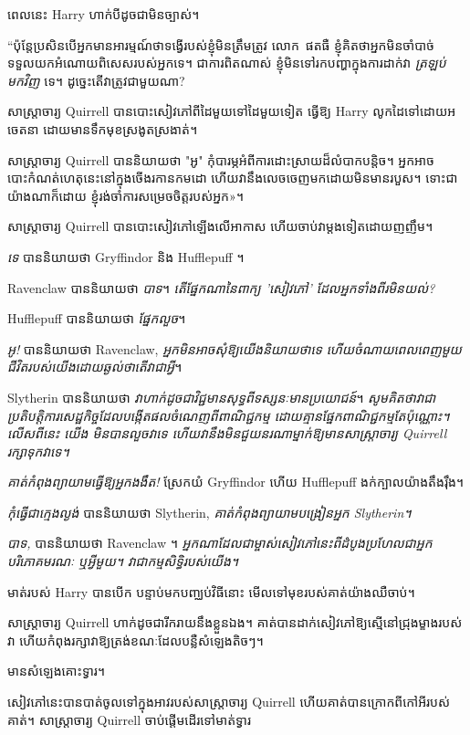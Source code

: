 {{{{ពេលនេះ Harry ហាក់បីដូចជាមិនច្បាស់។

“ប៉ុន្តែប្រសិនបើអ្នកមានអារម្មណ៍ថាទង្វើរបស់ខ្ញុំមិនត្រឹមត្រូវ លោក~ផតធឺ ខ្ញុំគិតថាអ្នកមិនចាំបាច់ទទួលយកអំណោយពិសេសរបស់អ្នកទេ។ ជាការពិតណាស់ ខ្ញុំមិនទៅរកបញ្ហាក្នុងការដាក់វា \emph{ត្រឡប់មកវិញ} ទេ។ ដូច្នេះ​តើ​វា​ត្រូវ​ជា​មួយ​ណា?

សាស្ត្រាចារ្យ Quirrell បានបោះសៀវភៅពីដៃមួយទៅដៃមួយទៀត ធ្វើឱ្យ Harry លូកដៃទៅដោយអចេតនា ដោយមានទឹកមុខស្រងូតស្រងាត់។

សាស្រ្តាចារ្យ Quirrell បាននិយាយថា "អូ" កុំបារម្ភអំពីការដោះស្រាយដ៏លំបាកបន្តិច។ អ្នកអាចបោះកំណត់ហេតុនេះនៅក្នុងចើងរកានកមដោ ហើយវានឹងលេចចេញមកដោយមិនមានរបួស។ ទោះ​ជា​យ៉ាង​ណា​ក៏​ដោយ ខ្ញុំ​រង់ចាំ​ការ​សម្រេច​ចិត្ត​របស់​អ្នក»។

សាស្ត្រាចារ្យ Quirrell បានបោះសៀវភៅឡើងលើអាកាស ហើយចាប់វាម្តងទៀតដោយញញឹម។

\emph{ទេ} បាននិយាយថា Gryffindor និង Hufflepuff ។

Ravenclaw បាននិយាយថា \emph{បាទ}។ \emph{តើផ្នែកណានៃពាក្យ 'សៀវភៅ' ដែលអ្នកទាំងពីរមិនយល់?}

Hufflepuff បាននិយាយថា \emph{ផ្នែកលួច}។

\emph{អូ!} បាននិយាយថា Ravenclaw, \emph{អ្នកមិនអាចសុំឱ្យយើងនិយាយថាទេ ហើយចំណាយពេលពេញមួយជីវិតរបស់យើងដោយឆ្ងល់ថាតើវាជាអ្វី}។

Slytherin បាននិយាយថា \emph{វាហាក់ដូចជាវិជ្ជមានសុទ្ធពីទស្សនៈមានប្រយោជន៍}។ \emph{សូមគិតថាវាជាប្រតិបត្តិការសេដ្ឋកិច្ចដែលបង្កើតផលចំណេញពីពាណិជ្ជកម្ម ដោយគ្មានផ្នែកពាណិជ្ជកម្មតែប៉ុណ្ណោះ។ លើសពីនេះ \emph{យើង} មិនបានលួចវាទេ ហើយវានឹងមិនជួយនរណាម្នាក់ឱ្យមានសាស្រ្តាចារ្យ Quirrell រក្សាទុកវាទេ។}

\emph{គាត់កំពុងព្យាយាមធ្វើឱ្យអ្នកងងឹត!} ស្រែកយំ Gryffindor ហើយ Hufflepuff ងក់ក្បាលយ៉ាងតឹងរ៉ឹង។

\emph{កុំធ្វើជាក្មេងល្ងង់} បាននិយាយថា Slytherin, \emph{គាត់កំពុងព្យាយាមបង្រៀនអ្នក Slytherin។}

\emph{បាទ,} បាននិយាយថា Ravenclaw ។ \emph{អ្នកណាដែលជាម្ចាស់សៀវភៅនេះពីដំបូងប្រហែលជាអ្នកបរិភោគមរណៈ ឬអ្វីមួយ។ វា​ជា​កម្មសិទ្ធិ​របស់​យើង។}

មាត់របស់ Harry បានបើក បន្ទាប់មកបញ្ឈប់វិធីនោះ មើលទៅមុខរបស់គាត់យ៉ាងឈឺចាប់។

សាស្រ្តាចារ្យ Quirrell ហាក់ដូចជារីករាយនឹងខ្លួនឯង។ គាត់​បាន​ដាក់​សៀវភៅ​ឱ្យ​ស្មើ​នៅ​ជ្រុង​ម្ខាង​របស់​វា ហើយ​កំពុង​រក្សា​វា​ឱ្យ​ត្រង់​ខណៈ​ដែល​បន្លឺ​សំឡេង​តិចៗ។

មាន​សំឡេង​គោះ​ទ្វារ។

សៀវភៅនេះបានបាត់ចូលទៅក្នុងអាវរបស់សាស្រ្តាចារ្យ Quirrell ហើយគាត់បានក្រោកពីកៅអីរបស់គាត់។ សាស្រ្តាចារ្យ Quirrell ចាប់ផ្តើមដើរទៅមាត់ទ្វារ

}}}}
